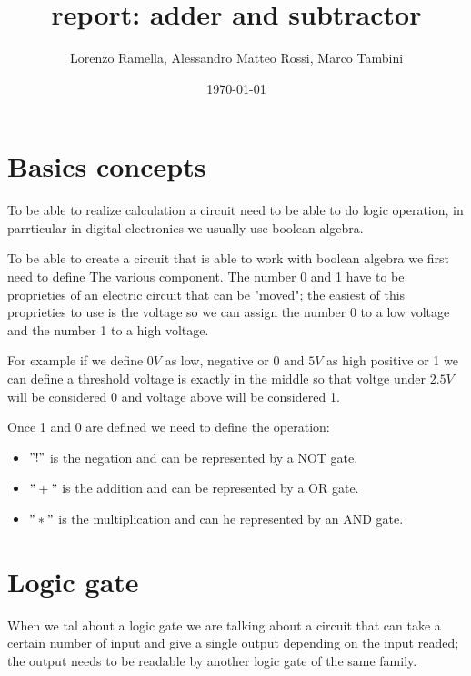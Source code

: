 \documentclass{article}
\title{report: adder and subtractor}
\author{Lorenzo Ramella, Alessandro Matteo Rossi, Marco Tambini}
\date{\today}
\begin{document}
\maketitle

\begin{abstract}

\end{abstract}
\tableofcontents

\section{Basics concepts}

To be able to realize calculation a circuit need to be able to do logic operation, in parrticular in digital electronics we usually use boolean algebra. 

\vspace{3mm}

To be able to create a circuit that is able to work with boolean algebra we first need to define The various component.
The number 0 and 1 have to be proprieties of an electric circuit that can be "moved"; the easiest of this proprieties to use is the voltage so we can assign the number 0 to a low voltage and the number 1 to a high voltage. 

\vspace{3mm}

For example if we define $0V$ as low, negative or 0 and $5V$ as high positive or 1 we can define a threshold voltage is exactly in the middle so that voltge under $2.5 V$ will be considered 0 and voltage above will be considered 1.

\vspace{3mm}

Once 1 and 0 are defined we need to define the operation:

\begin{itemize}
\item $"!"$ is the negation and can be represented by a NOT gate.
\item $"+"$ is the addition and can be represented by a OR gate.
\item $"*"$ is the multiplication and can he represented by an AND gate.
\end{itemize}

\section{Logic gate}

When we tal about a logic gate we are talking about a circuit that can take a certain number of input and give a single output depending on the input readed; the output needs to be readable by another logic gate of the same family.
\end{document}
